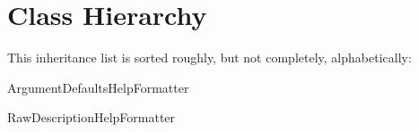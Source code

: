 \section{Class Hierarchy}
This inheritance list is sorted roughly, but not completely, alphabetically\+:\begin{DoxyCompactList}
\item Argument\+Defaults\+Help\+Formatter\begin{DoxyCompactList}
\item {}
\end{DoxyCompactList}
\item Raw\+Description\+Help\+Formatter\begin{DoxyCompactList}
\item {}
\end{DoxyCompactList}
\end{DoxyCompactList}
